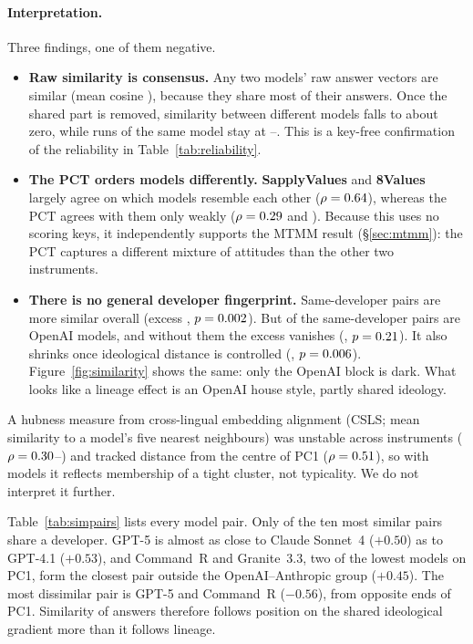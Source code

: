 \documentclass[11pt]{article}
\newcommand{\instSAP}[1]{\textcolor{cSAP}{\textbf{#1}}}
\newcommand{\instEV}[1]{\textcolor{cEV}{\textbf{#1}}}
\newcommand{\sap}{\instSAP{SapplyValues}\xspace}
\newcommand{\ev}{\instEV{8Values}\xspace}
\begin{document}
\paragraph{Interpretation.} Three findings, one of them negative.
\begin{itemize}[leftmargin=*,itemsep=1pt,topsep=2pt]
\item \textbf{Raw similarity is consensus.} Any two models' raw answer vectors are similar (mean cosine \nSimRaw), because they share most of their answers. Once the shared part is removed, similarity between different models falls to about zero, while runs of the same model stay at \nSimRunsWithinLo--\nSimRunsWithinHi. This is a key-free confirmation of the reliability in Table~\ref{tab:reliability}.
\item \textbf{The PCT orders models differently.} \sap and \ev largely agree on which models resemble each other ($\rho=0.64$), whereas the PCT agrees with them only weakly ($\rho=0.29$ and \nRsaPctEv). Because this uses no scoring keys, it independently supports the MTMM result (\S\ref{sec:mtmm}): the PCT captures a different mixture of attitudes than the other two instruments.
\item \textbf{There is no general developer fingerprint.} Same-developer pairs are more similar overall (excess \nLinAll, $p=0.002$). But \nNOAIPairs{} of the \nNSameDev{} same-developer pairs are OpenAI models, and without them the excess vanishes (\nLinNoOAI, $p=0.21$). It also shrinks once ideological distance is controlled (\nLinCtrl, $p=0.006$). Figure~\ref{fig:similarity} shows the same: only the OpenAI block is dark. What looks like a lineage effect is an OpenAI house style, partly shared ideology.
\end{itemize}
A hubness measure from cross-lingual embedding alignment (CSLS; mean similarity to a model's five nearest neighbours) was unstable across instruments ($\rho=0.30$--\nHubHi) and tracked distance from the centre of PC1 ($\rho=0.51$), so with \nNModels{} models it reflects membership of a tight cluster, not typicality. We do not interpret it further.

Table~\ref{tab:simpairs} lists every model pair. Only \nTopTenSameDev{} of the ten most similar pairs share a developer. GPT-5 is almost as close to Claude Sonnet~4 ($+0.50$) as to GPT-4.1 ($+0.53$), and Command~R and Granite~3.3, two of the lowest models on PC1, form the closest pair outside the OpenAI--Anthropic group ($+0.45$). The most dissimilar pair is GPT-5 and Command~R ($-0.56$), from opposite ends of PC1. Similarity of answers therefore follows position on the shared ideological gradient more than it follows lineage.
\end{document}
